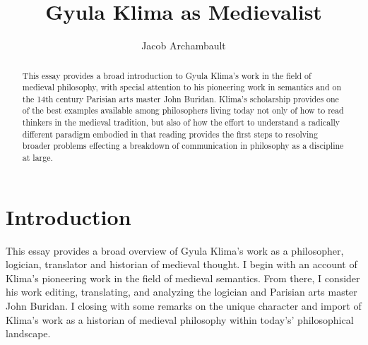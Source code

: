 \documentclass[]{article}
\title{Gyula Klima as Medievalist}
\author{Jacob Archambault}
\begin{document}
\maketitle
\begin{abstract}
This essay provides a broad introduction to Gyula Klima's work in the field of medieval philosophy, 
with special attention to 
his pioneering work in semantics 
and on 
the 14th century Parisian arts master 
John Buridan. 
Klima's scholarship 
provides one of the best examples available among philosophers living today not only 
of how to read thinkers in the medieval tradition, 
but also 
of how the effort to understand a radically different paradigm 
embodied in that reading 
provides the first steps 
to resolving broader problems effecting a breakdown of communication in philosophy as a discipline at large.
\end{abstract}

\section{Introduction}
This essay provides 
a broad overview 
of Gyula Klima's work 
as a philosopher, 
logician, 
translator and historian of medieval thought. 
I begin with an account of 
Klima's pioneering work in the field of medieval semantics. 
From there, I consider his work 
editing, 
translating, 
and analyzing 
the logician and Parisian arts master John Buridan. 
I closing with some remarks on the unique character and import of Klima's work as a historian of medieval philosophy within today's' philosophical landscape. 
\end{document}
